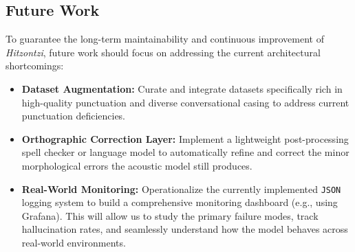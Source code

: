 \documentclass[12pt]{article}
\begin{document}
\subsection{Future Work}
To guarantee the long-term maintainability and continuous improvement of \textit{Hitzontzi}, future work should focus on addressing the current architectural shortcomings:
\begin{itemize}
    \item \textbf{Dataset Augmentation:} Curate and integrate datasets specifically rich in high-quality punctuation and diverse conversational casing to address current punctuation deficiencies.
    \item \textbf{Orthographic Correction Layer:} Implement a lightweight post-processing spell checker or language model to automatically refine and correct the minor morphological errors the acoustic model still produces.
    \item \textbf{Real-World Monitoring:} Operationalize the currently implemented \texttt{JSON} logging system to build a comprehensive monitoring dashboard (e.g., using Grafana). This will allow us to study the primary failure modes, track hallucination rates, and seamlessly understand how the model behaves across real-world environments.
\end{itemize}
\end{document}
